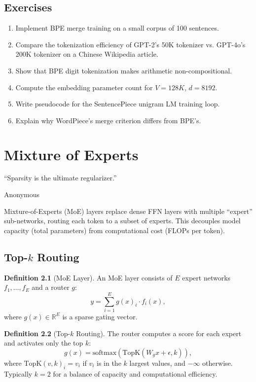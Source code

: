 \documentclass[11pt,a4paper]{book}
\theoremstyle{definition}
\newtheorem{definition}{Definition}[chapter]
\begin{document}
\section{Exercises}

\begin{enumerate}
	\item Implement BPE merge training on a small corpus of 100 sentences.
	\item Compare the tokenization efficiency of GPT-2's 50K tokenizer vs. GPT-4o's 200K tokenizer on a Chinese Wikipedia article.
	\item Show that BPE digit tokenization makes arithmetic non-compositional.
	\item Compute the embedding parameter count for $V=128K$, $d=8192$.
	\item Write pseudocode for the SentencePiece unigram LM training loop.
	\item Explain why WordPiece's merge criterion differs from BPE's.
\end{enumerate}

\chapter{Mixture of Experts}
\label{ch:moe}

\epigraph{``Sparsity is the ultimate regularizer.''}{Anonymous}

Mixture-of-Experts (MoE) layers replace dense FFN layers with multiple ``expert'' sub-networks, routing each token to a subset of experts. This decouples model capacity (total parameters) from computational cost (FLOPs per token).

\section{Top-$k$ Routing}

\begin{definition}[MoE Layer]
	An MoE layer consists of $E$ expert networks $f_1, \dots, f_E$ and a router $g$:
	\begin{equation}
		y = \sum_{i=1}^E g(x)_i \cdot f_i(x),
	\end{equation}
	where $g(x) \in \mathbb{R}^E$ is a sparse gating vector.
\end{definition}

\begin{definition}[Top-$k$ Routing]
	The router computes a score for each expert and activates only the top $k$:
	\begin{equation}
		g(x) = \text{softmax}\left(\text{TopK}\left(W_g x + \epsilon, k\right)\right),
	\end{equation}
	where $\text{TopK}(v, k)_i = v_i$ if $v_i$ is in the $k$ largest values, and $-\infty$ otherwise.
	Typically $k = 2$ for a balance of capacity and computational efficiency.
\end{definition}
\end{document}
